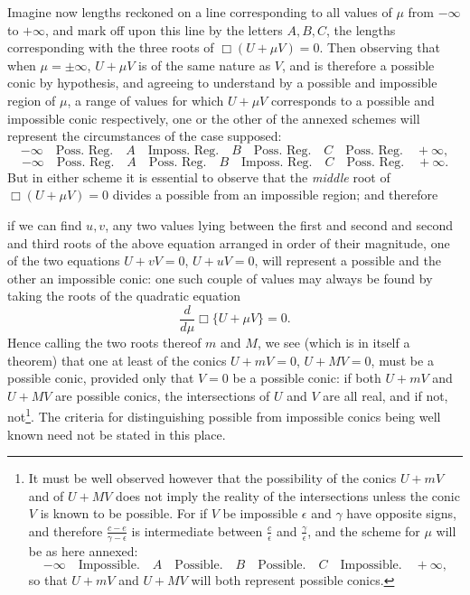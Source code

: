 \documentclass[11pt]{article}
\newcommand{\sourcepage}[1]{\marginpar{\scriptsize p.~#1}}
\begin{document}
{{Imagine now lengths reckoned on a line corresponding to all values of $\mu$ from $-\infty$ to $+\infty$, and mark off upon this line by the letters $A,B,C$, the lengths corresponding with the three roots of $\Box(U+\mu V)=0$. Then observing that when $\mu=\pm\infty$, $U+\mu V$ is of the same nature as $V$, and is therefore a possible conic by hypothesis, and agreeing to understand by a possible and impossible region of $\mu$, a range of values for which $U+\mu V$ corresponds to a possible and impossible conic respectively, one or the other of the annexed schemes will represent the circumstances of the case supposed:
\[
-\infty\quad\text{Poss. Reg.}\quad A\quad\text{Imposs. Reg.}\quad B\quad\text{Poss. Reg.}\quad C\quad\text{Poss. Reg.}\quad+\infty,
\]
\[
-\infty\quad\text{Poss. Reg.}\quad A\quad\text{Poss. Reg.}\quad B\quad\text{Imposs. Reg.}\quad C\quad\text{Poss. Reg.}\quad+\infty.
\]
But in either scheme it is essential to observe that the \emph{middle} root of $\Box(U+\mu V)=0$ divides a possible from an impossible region; and therefore

\sourcepage{125}
if we can find $u,v$, any two values lying between the first and second and second and third roots of the above equation arranged in order of their magnitude, one of the two equations $U+vV=0$, $U+uV=0$, will represent a possible and the other an impossible conic: one such couple of values may always be found by taking the roots of the quadratic equation
\[
\frac{d}{d\mu}\Box\{U+\mu V\}=0.
\]
Hence calling the two roots thereof $m$ and $M$, we see (which is in itself a theorem) that one at least of the conics $U+mV=0$, $U+MV=0$, must be a possible conic, provided only that $V=0$ be a possible conic: if both $U+mV$ and $U+MV$ are possible conics, the intersections of $U$ and $V$ are all real, and if not, not\footnote{It must be well observed however that the possibility of the conics $U+mV$ and of $U+MV$ does not imply the reality of the intersections unless the conic $V$ is known to be possible. For if $V$ be impossible $\epsilon$ and $\gamma$ have opposite signs, and therefore $\frac{c-e}{\gamma-\epsilon}$ is intermediate between $\frac{c}{\epsilon}$ and $\frac{\gamma}{\epsilon}$, and the scheme for $\mu$ will be as here annexed:
\[
-\infty\quad\text{Impossible.}\quad A\quad\text{Possible.}\quad B\quad\text{Possible.}\quad C\quad\text{Impossible.}\quad+\infty,
\]
so that $U+mV$ and $U+MV$ will both represent possible conics.}. The criteria for distinguishing possible from impossible conics being well known need not be stated in this place.

}}
\end{document}
